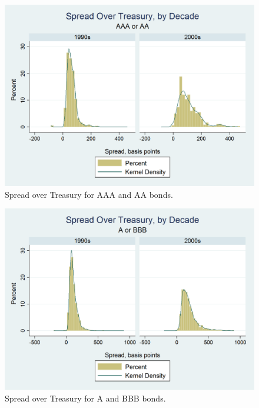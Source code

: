\documentclass[titlepage]{article}
\begin{document}
\begin{figure}[ht]
\centering
\includegraphics[width=\textwidth]{Spread_HiIG.png}
\caption{Spread over Treasury for AAA and AA bonds.}
\label{fig:spdHI}
\end{figure}

\begin{figure}[ht]
\centering
\includegraphics[width=\textwidth]{Spread_LoIG.png}
\caption{Spread over Treasury for A and BBB bonds.}
\label{fig:spdLO}
\end{figure}
\end{document}
